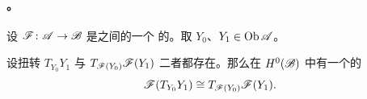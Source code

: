 \paragraph{\trFunctoriality。}\label{sub:twist-functoriality}
设 $\mathscr{F}\colon\mathscr{A}\to\mathscr{B}$ 是\trACategory{}之间的一个%
\trCohomology\trFullyFaithful{}的\trFunctor。取 $Y_0$、$Y_1\in\operatorname{Ob}\mathscr{A}$。

\begin{lemma}\label{thm:twist-functorial-isomorphism}
设扭转 $T_{Y_0}Y_1$ 与 $T_{\mathscr{F}(Y_0)}\mathscr{F}(Y_1)$ 二者都存在。那么在
$H^0(\mathscr{B})$ 中有一个\trCanonical{}的\trIsomorphism
\begin{equation}\label{eq:functorial-twist-isomorphism}
\mathscr{F}(T_{Y_0}Y_1)\cong T_{\mathscr{F}(Y_0)}\mathscr{F}(Y_1).
\end{equation}
\end{lemma}

